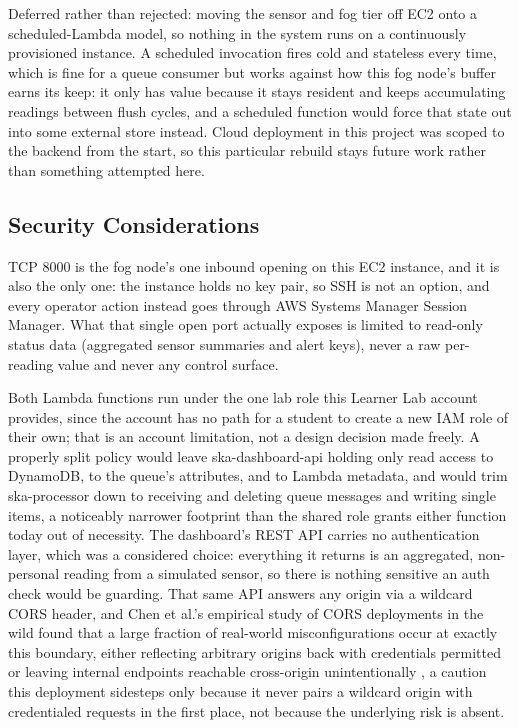 \documentclass[conference]{IEEEtran}
\begin{document}
Deferred rather than rejected: moving the sensor and fog tier off EC2 onto a scheduled-Lambda model, so nothing in the system runs on a continuously provisioned instance. A scheduled invocation fires cold and stateless every time, which is fine for a queue consumer but works against how this fog node's buffer earns its keep: it only has value because it stays resident and keeps accumulating readings between flush cycles, and a scheduled function would force that state out into some external store instead. Cloud deployment in this project was scoped to the backend from the start, so this particular rebuild stays future work rather than something attempted here.

\subsection{Security Considerations}
TCP 8000 is the fog node's one inbound opening on this EC2 instance, and it is also the only one: the instance holds no key pair, so SSH is not an option, and every operator action instead goes through AWS Systems Manager Session Manager. What that single open port actually exposes is limited to read-only status data (aggregated sensor summaries and alert keys), never a raw per-reading value and never any control surface.

Both Lambda functions run under the one lab role this Learner Lab account provides, since the account has no path for a student to create a new IAM role of their own; that is an account limitation, not a design decision made freely. A properly split policy would leave ska-dashboard-api holding only read access to DynamoDB, to the queue's attributes, and to Lambda metadata, and would trim ska-processor down to receiving and deleting queue messages and writing single items, a noticeably narrower footprint than the shared role grants either function today out of necessity. The dashboard's REST API carries no authentication layer, which was a considered choice: everything it returns is an aggregated, non-personal reading from a simulated sensor, so there is nothing sensitive an auth check would be guarding. That same API answers any origin via a wildcard CORS header, and Chen et al.'s empirical study of CORS deployments in the wild found that a large fraction of real-world misconfigurations occur at exactly this boundary, either reflecting arbitrary origins back with credentials permitted or leaving internal endpoints reachable cross-origin unintentionally \cite{ref7}, a caution this deployment sidesteps only because it never pairs a wildcard origin with credentialed requests in the first place, not because the underlying risk is absent.
\end{document}
